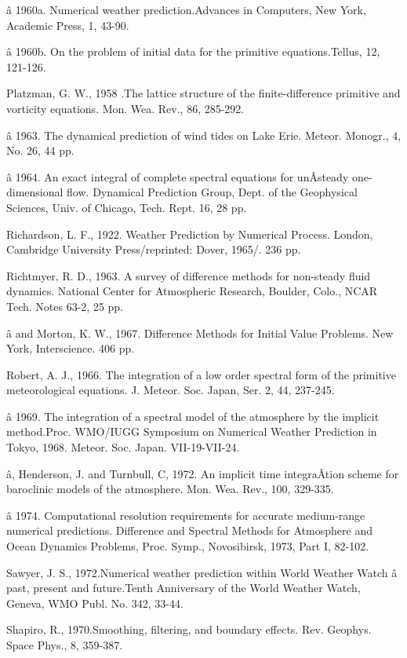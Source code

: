 â 1960a. Numerical weather prediction.Advances in Computers, New York,
Academic Press, 1, 43-90.

â 1960b. On the problem of initial data for the primitive
equations.Tellus, 12, 121-126.

Platzman, G. W., 1958 .The lattice structure of the finite-difference
primitive and vorticity equations. Mon. Wea. Rev., 86, 285-292.

â 1963. The dynamical prediction of wind tides on Lake Erie. Meteor.
Monogr., 4, No. 26, 44 pp.

â 1964. An exact integral of complete spectral equations for unÂ­steady
one-dimensional flow. Dynamical Prediction Group, Dept. of the
Geophysical Sciences, Univ. of Chicago, Tech. Rept. 16, 28 pp.

Richardson, L. F., 1922. Weather Prediction by Numerical Process.
London, Cambridge University Press/reprinted: Dover, 1965/. 236 pp.

Richtmyer, R. D., 1963. A survey of difference methods for non-steady
fluid dynamics. National Center for Atmospheric Research, Boulder,
Colo., NCAR Tech. Notes 63-2, 25 pp.

â and Morton, K. W., 1967. Difference Methods for Initial Value
Problems. New York, Interscience. 406 pp.

Robert, A. J., 1966. The integration of a low order spectral form of the
primitive meteorological equations. J. Meteor. Soc. Japan, Ser. 2, 44,
237-245.

â 1969. The integration of a spectral model of the atmosphere by the
implicit method.Proc. WMO/IUGG Symposium on Numerical Weather Prediction
in Tokyo, 1968. Meteor. Soc. Japan. VII-19-VII-24.

â, Henderson, J. and Turnbull, C, 1972. An implicit time integraÂ­tion
scheme for baroclinic models of the atmosphere. Mon. Wea. Rev., 100,
329-335.

â 1974. Computational resolution requirements for accurate medium-range
numerical predictions. Difference and Spectral Methods for Atmosphere
and Ocean Dynamics Problems, Proc. Symp., Novosibirsk, 1973, Part I,
82-102.

Sawyer, J. S., 1972.Numerical weather prediction within World Weather
Watch â past, present and future.Tenth Anniversary of the World Weather
Watch, Geneva, WMO Publ. No. 342, 33-44.

Shapiro, R., 1970.Smoothing, filtering, and boundary effects. Rev.
Geophys. Space Phys., 8, 359-387.

